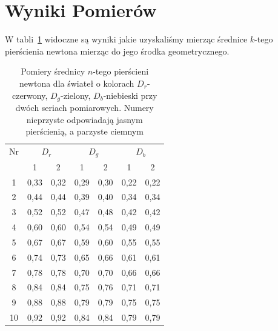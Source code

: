 \documentclass[12pt]{article}
\begin{document}
\section{Wyniki Pomierów}
W tabli~\ref{tab:rgb_measurements_reversed} widoczne są wyniki jakie uzyskaliśmy mierząc średnice \(k\)-tego pierścienia newtona mierząc do jego środka geometrycznego.
\begin{table}[H]
	\centering
	\begin{tabular}{c|cc|cc|cc}
		\toprule
		Nr & \multicolumn{2}{c|}{\(D_r\)} & \multicolumn{2}{c|}{\(D_g\)} & \multicolumn{2}{c}{\(D_b\)}                            \\
		   & 1                            & 2                            & 1                           & 2      & 1      & 2      \\
		\midrule
		1  & 0{,}33                       & 0{,}32                       & 0{,}29                      & 0{,}30 & 0{,}22 & 0{,}22 \\
		2  & 0{,}44                       & 0{,}44                       & 0{,}39                      & 0{,}40 & 0{,}34 & 0{,}34 \\
		3  & 0{,}52                       & 0{,}52                       & 0{,}47                      & 0{,}48 & 0{,}42 & 0{,}42 \\
		4  & 0{,}60                       & 0{,}60                       & 0{,}54                      & 0{,}54 & 0{,}49 & 0{,}49 \\
		5  & 0{,}67                       & 0{,}67                       & 0{,}59                      & 0{,}60 & 0{,}55 & 0{,}55 \\
		6  & 0{,}74                       & 0{,}73                       & 0{,}65                      & 0{,}66 & 0{,}61 & 0{,}61 \\
		7  & 0{,}78                       & 0{,}78                       & 0{,}70                      & 0{,}70 & 0{,}66 & 0{,}66 \\
		8  & 0{,}84                       & 0{,}84                       & 0{,}75                      & 0{,}76 & 0{,}71 & 0{,}71 \\
		9  & 0{,}88                       & 0{,}88                       & 0{,}79                      & 0{,}79 & 0{,}75 & 0{,}75 \\
		10 & 0{,}92                       & 0{,}92                       & 0{,}84                      & 0{,}84 & 0{,}79 & 0{,}79 \\
		\bottomrule
	\end{tabular}
	\caption{Pomiery średnicy \(n\)-tego pierścieni newtona dla świateł o kolorach \(D_r\)-czerwony, \(D_g\)-zielony, \(D_b\)-niebieski przy dwóch seriach pomiarowych. Numery nieprzyste odpowiadają jasnym pierścienią, a parzyste ciemnym}
	\label{tab:rgb_measurements_reversed}
\end{table}
\end{document}
